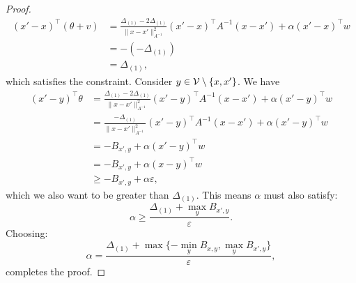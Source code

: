 \begin{proof}
    \begin{align*}
        (x' - x)^\top(\theta + v) &= \frac{\Delta_{(1)} - 2\Delta_{(1)}}{\|x-x'\|_{A^{-1}}^2}(x' - x)^\top A^{-1}(x-x') + \alpha(x' -x)^\top w\\
        &= -(-\Delta_{(1)})\\
        &= \Delta_{(1)},
    \end{align*}
    which satisfies the constraint. Consider $y \in \mathcal{V} \setminus \{x,x'\}$. We have \begin{align*}
        (x' - y)^\top\theta &= \frac{\Delta_{(1)} - 2\Delta_{(1)}}{\|x-x'\|_{A^{-1}}^2}(x' - y)^\top A^{-1}(x-x') + \alpha(x' -y)^\top w\\
        &=\frac{-\Delta_{(1)}}{\|x-x'\|_{A^{-1}}^2}(x' - y)^\top A^{-1}(x-x') + \alpha(x' -y)^\top w \\
        &= - B_{x',y} + \alpha(x' -y)^\top w \\
        &= - B_{x',y} + \alpha(x -y)^\top w \\
        &\geq - B_{x',y}  + \alpha \varepsilon,
    \end{align*}
    which we also want to be greater than $\Delta_{(1)}$. This means $\alpha$ must also satisfy: \begin{equation}\alpha \geq \frac{\Delta_{(1)}+ \max_{y}B_{x',y}}{\varepsilon}.\end{equation}
Choosing:
    \begin{equation}\alpha = \frac{\Delta_{(1)} + \max\{-\min_{y}B_{x,y},\max_{y}B_{x',y}\}}{\varepsilon},\end{equation}
    completes the proof.
\end{proof}



